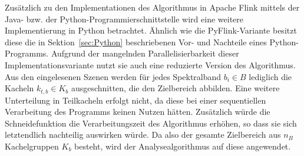 Zusätzlich zu den Implementationen des Algorithmus in Apache Flink mittels der Java- bzw. der Python-Programmierschnittstelle wird eine weitere Implementierung in Python betrachtet. Ähnlich wie die PyFlink-Variante besitzt diese die in Sektion~\ref{sec:Python} beschriebenen Vor- und Nachteile eines Python-Programms. Aufgrund der mangelnden Parallelisierbarkeit dieser Implementationsvariante nutzt sie auch eine reduzierte Version des Algorithmus. Aus den eingelesenen Szenen werden für jedes Spektralband $b_i \in B $ lediglich die Kacheln $k_{t, b} \in K_{b}$ ausgeschnitten, die den Zielbereich abbilden. Eine weitere Unterteilung in Teilkacheln erfolgt nicht, da diese bei einer sequentiellen Verarbeitung des Programms keinen Nutzen hätten. Zusätzlich würde die Schneidefunktion die Verarbeitungszeit des Algorithmus erhöhen, so dass sie sich letztendlich nachteilig auswirken würde. Da also der gesamte Zielbereich aus $n_B$ Kachelgruppen $K_b$ besteht, wird der Analysealgorithmus auf diese angewendet.



